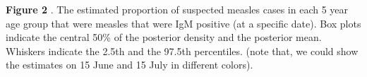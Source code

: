 \textbf{Figure 2} . The estimated proportion of suspected measles cases
in each 5 year age group that were measles that were IgM positive (at a
specific date). Box plots indicate the central 50\% of the posterior
density and the posterior mean. Whiskers indicate the 2.5th and the
97.5th percentiles. (note that, we could show the estimates on 15 June
and 15 July in different colors).